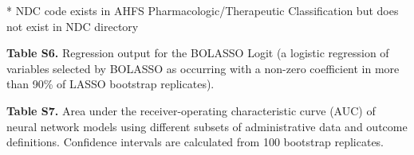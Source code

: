 \documentclass[10pt, letter]{article}
\begin{document}
* NDC code exists in AHFS Pharmacologic/Therapeutic Classification but does not exist in NDC directory
\normalsize

\newpage

\textbf{Table S6.} Regression output for the BOLASSO Logit (a logistic regression of variables selected by BOLASSO as occurring with a non-zero coefficient in more than 90\% of LASSO bootstrap replicates).

\tiny

\normalsize

\newpage

\textbf{Table S7.} Area under the receiver-operating characteristic curve (AUC) of neural network models using different subsets of administrative data and outcome definitions. Confidence intervals are calculated from 100 bootstrap replicates.

\scriptsize

\normalsize

\newpage
\end{document}
